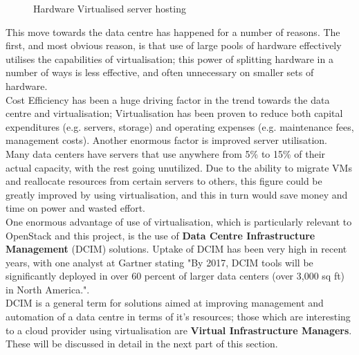 \begin{figure}[ht]
\centering
{}
\caption{Hardware Virtualised server hosting \cite{principlesparadigms}}
\end{figure}

This move towards the data centre has happened for a number of reasons. The first, and most obvious reason, is that use of large pools of hardware effectively utilises the capabilities of virtualisation; this power of splitting hardware in a number of ways is less effective, and often unnecessary on smaller sets of hardware.  \\
Cost Efficiency has been a huge driving factor in the trend towards the data centre and virtualisation; Virtualisation has been proven to reduce both capital expenditures (e.g. servers, storage) and operating expenses (e.g. maintenance 
 fees, management costs)\cite{agilysis}. Another enormous factor is improved server utilisation. Many data centers have servers that use anywhere from 
 5\% to 15\% of their actual capacity, with the rest going unutilized\cite{agilysis}. Due to the ability to migrate VMs and reallocate resources from certain servers to others, this figure could be greatly improved by using virtualisation, and this in turn would save money and time on power and wasted effort. \\ 
One enormous advantage of use of virtualisation, which is particularly relevant to OpenStack and this project, is the use of \textbf{Data Centre Infrastructure Management} (DCIM) solutions. Uptake of DCIM has been very high in recent years, with one analyst at Gartner stating "By 2017, DCIM tools will be significantly deployed in over 60 percent of larger data centers (over 3,000 sq ft) in North America."\cite{dcimautomation}. \\ 

DCIM is a general term for solutions aimed at improving management and automation of a data centre in terms of it's resources; those which are interesting to a cloud provider using virtualisation are \textbf{Virtual Infrastructure Managers}. These will be discussed in detail in the next part of this section. 
   
